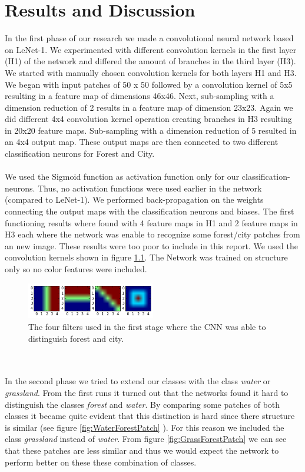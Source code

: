 \documentclass[a4paper,onecolumn]{report}
\begin{document}
\chapter{Results and Discussion}
\label{sec:resultsanddiscussion}
In the first phase of our research we made a convolutional neural network based on LeNet-1. We experimented with different convolution kernels in the first layer (H1) of the network and differed the amount of branches in the third layer (H3). We started with manually chosen convolution kernels for both layers H1 and H3. We began with input patches of 50 x 50 followed by a convolution kernel of 5x5 resulting in a feature map of dimensions 46x46. Next, sub-sampling with a dimension reduction of 2 results in a feature map of dimension 23x23. Again we did different 4x4 convolution kernel operation creating branches in H3 resulting in 20x20 feature maps. Sub-sampling with a dimension reduction of 5 resulted in an 4x4 output map. These output maps are then connected to two different classification neurons for Forest and City. \\\\
We used the Sigmoid function as activation function only for our classification-neurons. Thus, no activation functions were used earlier in the network (compared to LeNet-1). We performed back-propagation on the weights connecting the output maps with the classification neurons and biases. The first functioning results where found with 4 feature maps in H1 and 2 feature maps in H3 each where the network was enable to recognize some forest/city patches from an new image. These results were too poor to include in this report. We used the convolution kernels shown in figure \ref{fig:firstFilters}. The Network was trained on structure only so no color features were included. 
\begin{figure}[bth!]
	\centering
	\includegraphics[width=0.5\textwidth]{./images/firstFilters.png}
	\caption{The four filters used in the first stage where the CNN was able to distinguish forest and city.}
	\label{fig:firstFilters}
\end{figure} 
\\\\
In the second phase we tried to extend our classes with the class \textit{water} or \textit{grassland}. From the first runs it turned out that the networks found it hard to distinguish the classes \textit{forest} and \textit{water}. By comparing some patches of both classes it became quite evident that this distinction is hard since there structure is similar (see figure \ref{fig:WaterForestPatch} ). For this reason we included the class \textit{grassland} instead of \textit{water}. From figure \ref{fig:GrassForestPatch} we can see that these patches are less similar and thus we would expect the network to perform better on these these combination of classes.
\end{document}
